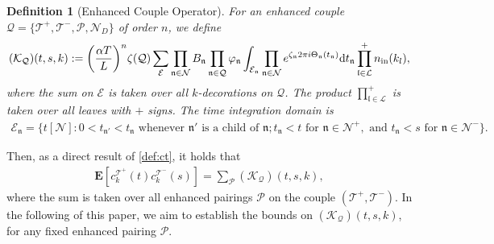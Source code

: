 \documentclass[UTF-8,reqno]{amsart}
\numberwithin{equation}{section}
\newtheorem{definition}[theorem]{Definition}
\theoremstyle{definition}
\def\dif{{\mathord{{\rm d}}}}
\def\dif{{\mathord{{\rm d}}}}
\begin{document}
\begin{definition}[Enhanced Couple Operator]
\label{def:enhanced_couple}
For an enhanced couple  $\mathcal{Q}=\{\mathcal{T}^+,\mathcal{T}^-,\mathcal{P},\mathcal{N}_D\}$ of order $n$, we define  
\begin{align*}
(\mathcal{K}_\mathcal{Q})(t,s,k) := \bigg(\frac{\alpha T}{L}\bigg)^n \zeta(\mathcal{Q}) \sum_{\mathcal{E}}  %
\prod_{\mathfrak{n}\in\mathcal{N}}B_\mathfrak{n}\prod_{\mathfrak{n}\in\mathcal{Q}}\varphi_\mathfrak{n}
\int_{\mathcal{E}_\mathfrak{n}}\prod_{\mathfrak{n}\in\mathcal{N}}  e^{\zeta_\mathfrak{n}2\pi i\Theta_\mathfrak{n}(t_\mathfrak{n}) } \dif t_\mathfrak{n}
\prod_{\mathfrak{l} \in \mathcal{L}}^+ n_{\rm in}(k_l),
\end{align*}
where  the sum on $\mathcal{E}$ is taken over all $k$-decorations on $\mathcal{Q}$.
 The product $\prod_{\mathfrak{l} \in \mathcal{L}}^+$ is taken over all leaves with $+$ signs. 
The time integration domain is
\begin{align*}
\mathcal{E}_\mathfrak{n} = \{t{[\mathcal{N}]} : 0 < t_{\mathfrak{n}'} < t_\mathfrak{n}  \text{ whenever } \mathfrak{n}' \text{ is a child of } \mathfrak{n} ; 
t_\mathfrak{n}  < t \text{ for } \mathfrak{n}  \in \mathcal{N}^+, \text{ and } t_\mathfrak{n}  < s \text{ for } \mathfrak{n}  \in \mathcal{N}^-\}.
\end{align*}
\end{definition}

Then, as a direct result of \eqref{def:ct}, it holds that 
 \begin{align}
     \mathbf{E}[ c^{\mathcal{T}^+}_k (t)c^{\mathcal{T}^-}_k(s)] =\sum_{\mathcal{P}} (\mathcal{K}_\mathcal{Q})(t,s,k),
 \end{align}
where the  sum is taken over  all enhanced pairings $\mathcal{P}$ on the couple $(\mathcal{T}^+,\mathcal{T}^-)$.
In the following of this paper, we aim to establish the bounds on $(\mathcal{K}_\mathcal{Q})(t,s,k)$, for any fixed  enhanced pairing $\mathcal{P}$.
\end{document}
